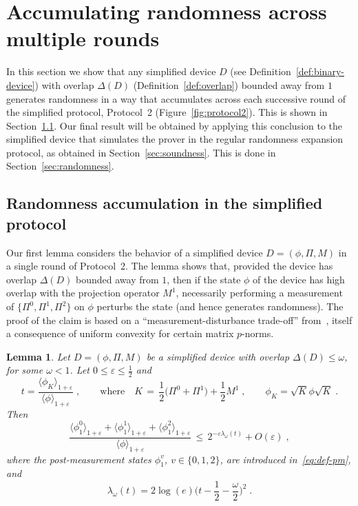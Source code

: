 \documentclass[11pt]{article}
\newtheorem{lemma}[theorem]{Lemma}
\theoremstyle{remark}
\theoremstyle{definition}
\newcommand{\eps}{\varepsilon}
\begin{document}
\section{Accumulating randomness across multiple rounds}
\label{sec:multi-round}

In this section we show that any simplified device $D$ (see Definition~\ref{def:binary-device}) with overlap $\Delta(D)$ (Definition~\ref{def:overlap}) bounded away from $1$ generates randomness in a way that accumulates across each successive round of the simplified protocol, Protocol~2 (Figure~\ref{fig:protocol2}). This is shown in Section~\ref{sec:simplified}. Our final result will be obtained by applying this conclusion to the simplified device that simulates the prover in the regular randomness expansion protocol, as obtained in Section~\ref{sec:soundness}. This is done in Section~\ref{sec:randomness}.

\subsection{Randomness accumulation in the simplified protocol}
\label{sec:simplified}

Our first lemma considers the behavior of a simplified device $D=(\phi,\Pi,M)$ in a single round of Protocol~2. The lemma shows that, provided the device has overlap $\Delta(D)$ bounded away from $1$, then if the state $\phi$ of the device has high overlap with the projection operator $M^1$, necessarily performing a measurement of $\{\Pi^0,\Pi^1,\Pi^2\}$ on $\phi$ perturbs the state (and hence generates randomness). The proof of the claim is based on a ``measurement-disturbance trade-off'' from~\cite{miller2016robust}, itself a consequence of uniform convexity for certain matrix $p$-norms. 

\begin{lemma}\label{lem:ms-uncertainty}
Let $D = (\phi,\Pi,M)$ be a simplified device with overlap $\Delta(D)\leq \omega$, for some $\omega<1$. Let  $0\leq \eps \leq \frac{1}{2}$ and 
\begin{equation}\label{eq:game-operator}
t = \frac{\langle \phi_K \rangle_{1+\eps} }{\langle \phi \rangle_{1+\eps}}\;,\qquad\text{where}\quad K \,=\, \frac{1}{2} \big(\Pi^0 + \Pi^1\big) + \frac{1}{2} M^1\;,\qquad \phi_K = \sqrt{K} \phi \sqrt{K}\;.
\end{equation}
Then 
$$\frac{ \langle \phi_1^0 \rangle_{1+\eps} + \langle \phi_1^1 \rangle_{1+\eps} + \langle \phi_1^2 \rangle_{1+\eps}}{\langle \phi \rangle_{1+\eps}} \,\leq\, 2^{-\eps \lambda_\omega(t)} +O(\eps)\;,$$
where the post-measurement states $\phi_1^v$, $v\in\{0,1,2\}$, are introduced in~\eqref{eq:def-pm}, and
\begin{equation}\label{eq:def-lambda}
\lambda_\omega(t) = 2\log(e)\Big(t-\frac{1}{2}-\frac{\omega}{2}\Big)^2\;.
\end{equation} 
\end{lemma}
\end{document}
